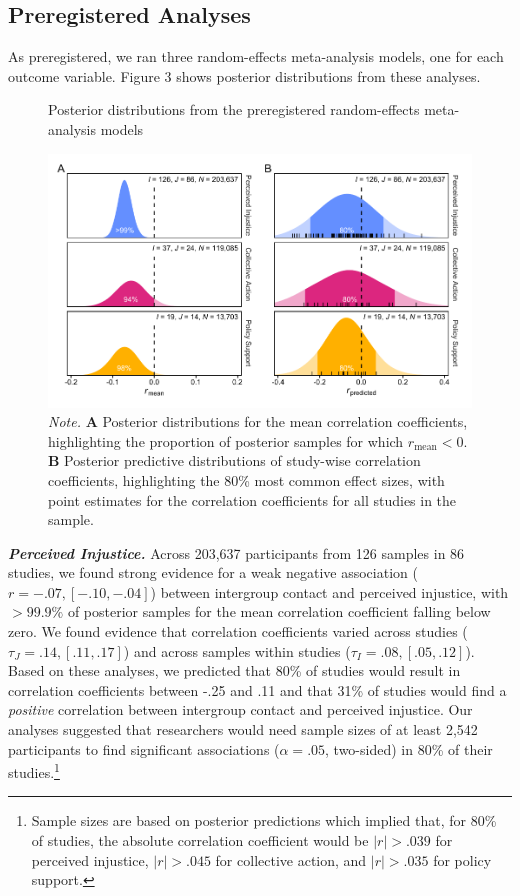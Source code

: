 \documentclass[12pt, letterpaper]{article}
\begin{document}
\hypertarget{preregistered-analyses-1}{%
\subsection{Preregistered Analyses}\label{preregistered-analyses-1}}

As preregistered, we ran three random-effects meta-analysis models, one
for each outcome variable. Figure 3 shows posterior distributions from
these analyses.

\begin{figure}[t!]
\centering
\caption{Posterior distributions from the preregistered random-effects meta-analysis models}
\includegraphics[scale=1]{../figures/figure-3}
\caption*{\textit{Note.} \textbf{A} Posterior distributions for the mean correlation coefficients, highlighting the proportion of posterior samples for which $r_\text{mean} < 0$. \textbf{B} Posterior predictive distributions of study-wise correlation coefficients, highlighting the 80\% most common effect sizes, with point estimates for the correlation coefficients for all studies in the sample.}
\label{fig:f3}
\end{figure}

\textbf{\emph{Perceived Injustice.}} Across 203,637 participants from
126 samples in 86 studies, we found strong evidence for a weak negative
association (\(r = -.07, [-.10, -.04]\)) between intergroup contact and
perceived injustice, with \(>99.9\%\) of posterior samples for the mean
correlation coefficient falling below zero. We found evidence that
correlation coefficients varied across studies
(\(\tau_J = .14, [.11, .17]\)) and across samples within studies
(\(\tau_I = .08, [.05, .12]\)). Based on these analyses, we predicted
that 80\% of studies would result in correlation coefficients between
-.25 and .11 and that 31\% of studies would find a \emph{positive}
correlation between intergroup contact and perceived injustice. Our
analyses suggested that researchers would need sample sizes of at least
2,542 participants to find significant associations (\(\alpha = .05\),
two-sided) in 80\% of their studies.\footnote{Sample sizes are based on
  posterior predictions which implied that, for 80\% of studies, the
  absolute correlation coefficient would be \(|r| > .039\) for perceived
  injustice, \(|r| > .045\) for collective action, and \(|r| > .035\)
  for policy support.}
\end{document}
